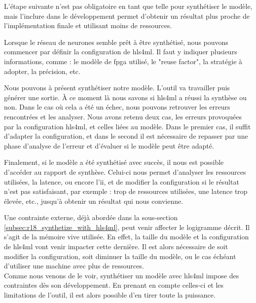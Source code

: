 L'étape suivante n'est pas obligatoire en tant que telle pour synthétiser le modèle, mais l'inclure dans le développement permet d'obtenir un résultat plus proche de l'implémentation finale et utilisant moins de ressources.

Lorsque le réseau de neurones semble prêt à être synthétisé, nous pouvons commencer par définir la configuration de \acrshort{hls4ml}. Il faut y indiquer plusieurs informations, comme : le modèle de \acrshort{fpga} utilisé, le "reuse factor", la stratégie à adopter, la précision, etc.

Nous pouvons à présent synthétiser notre modèle. L'outil va travailler puis générer une sortie. À ce moment là nous savons si \acrshort{hls4ml} a réussi la synthèse ou non. Dans le cas où cela a été un échec, nous pouvons retrouver les erreurs rencontrées et les analyser. Nous avons retenu deux cas, les erreurs provoquées par la configuration \acrshort{hls4ml}, et celles liées au modèle. Dans le premier cas, il suffit d'adapter la configuration, et dans le second il est nécessaire de repasser par une phase d'analyse de l'erreur et d'évaluer si le modèle peut être adapté.

Finalement, si le modèle a été synthétisé avec succès, il nous est possible d'accéder au rapport de synthèse. Celui-ci nous permet d'analyser les ressources utilisées, la latence, ou encore l'\acrfull{ii}, et de modifier la configuration si le résultat n'est pas satisfaisant, par exemple : trop de ressources utilisées, une latence trop élevée, etc., jusqu'à obtenir un résultat qui nous convienne.

Une contrainte externe, déjà abordée dans la sous-section \ref{subsec:r18_synthetize_with_hls4ml}, peut venir affecter le logigramme décrit. Il s'agit de la mémoire vive utilisée. En effet, la taille du modèle et la configuration de \acrshort{hls4ml} vont venir impacter cette dernière. Il est alors nécessaire de soit modifier la configuration, soit diminuer la taille du modèle, ou le cas échéant d'utiliser une machine avec plus de ressources.\\

Comme nous venons de le voir, synthétiser un modèle avec \acrshort{hls4ml} impose des contraintes dès son développement. En prenant en compte celles-ci et les limitations de l'outil, il est alors possible d'en tirer toute la puissance.

